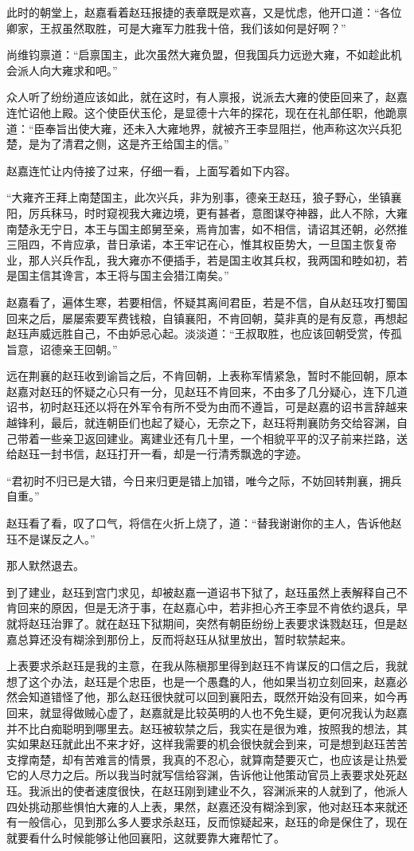 此时的朝堂上，赵嘉看着赵珏报捷的表章既是欢喜，又是忧虑，他开口道：“各位卿家，王叔虽然取胜，可是大雍军力胜我十倍，我们该如何是好啊？”

尚维钧禀道：“启禀国主，此次虽然大雍负盟，但我国兵力远逊大雍，不如趁此机会派人向大雍求和吧。”

众人听了纷纷道应该如此，就在这时，有人禀报，说派去大雍的使臣回来了，赵嘉连忙诏他上殿。这个使臣伏玉伦，是显德十六年的探花，现在在礼部任职，他跪禀道：“臣奉旨出使大雍，还未入大雍地界，就被齐王李显阻拦，他声称这次兴兵犯楚，是为了清君之侧，这是齐王给国主的信。”

赵嘉连忙让内侍接了过来，仔细一看，上面写着如下内容。

“大雍齐王拜上南楚国主，此次兴兵，非为别事，德亲王赵珏，狼子野心，坐镇襄阳，厉兵秣马，时时窥视我大雍边境，更有甚者，意图谋夺神器，此人不除，大雍南楚永无宁日，本王与国主郎舅至亲，焉肯加害，如不相信，请诏其还朝，必然推三阻四，不肯应承，昔日承诺，本王牢记在心，惟其权臣势大，一旦国主恢复帝业，那人兴兵作乱，我大雍亦不便插手，若是国主收其兵权，我两国和睦如初，若是国主信其谗言，本王将与国主会猎江南矣。”

赵嘉看了，遍体生寒，若要相信，怀疑其离间君臣，若是不信，自从赵珏攻打蜀国回来之后，屡屡索要军费钱粮，自镇襄阳，不肯回朝，莫非真的是有反意，再想起赵珏声威远胜自己，不由妒忌心起。淡淡道：“王叔取胜，也应该回朝受赏，传孤旨意，诏德亲王回朝。”

远在荆襄的赵珏收到谕旨之后，不肯回朝，上表称军情紧急，暂时不能回朝，原本赵嘉对赵珏的怀疑之心只有一分，见赵珏不肯回来，不由多了几分疑心，连下几道诏书，初时赵珏还以将在外军令有所不受为由而不遵旨，可是赵嘉的诏书言辞越来越锋利，最后，就连朝臣们也起了疑心，无奈之下，赵珏将荆襄防务交给容渊，自己带着一些亲卫返回建业。离建业还有几十里，一个相貌平平的汉子前来拦路，送给赵珏一封书信，赵珏打开一看，却是一行清秀飘逸的字迹。

“君初时不归已是大错，今日来归更是错上加错，唯今之际，不妨回转荆襄，拥兵自重。”

赵珏看了看，叹了口气，将信在火折上烧了，道：“替我谢谢你的主人，告诉他赵珏不是谋反之人。”

那人默然退去。

到了建业，赵珏到宫门求见，却被赵嘉一道诏书下狱了，赵珏虽然上表解释自己不肯回来的原因，但是无济于事，在赵嘉心中，若非担心齐王李显不肯依约退兵，早就将赵珏治罪了。就在赵珏下狱期间，突然有朝臣纷纷上表要求诛戮赵珏，但是赵嘉总算还没有糊涂到那份上，反而将赵珏从狱里放出，暂时软禁起来。

上表要求杀赵珏是我的主意，在我从陈稹那里得到赵珏不肯谋反的口信之后，我就想了这个办法，赵珏是个忠臣，也是一个愚蠢的人，他如果当初立刻回来，赵嘉必然会知道错怪了他，那么赵珏很快就可以回到襄阳去，既然开始没有回来，如今再回来，就显得做贼心虚了，赵嘉就是比较英明的人也不免生疑，更何况我认为赵嘉并不比白痴聪明到哪里去。赵珏被软禁之后，我实在是很为难，按照我的想法，其实如果赵珏就此出不来才好，这样我需要的机会很快就会到来，可是想到赵珏苦苦支撑南楚，却有苦难言的情景，我真的不忍心，就算南楚要灭亡，也应该是让热爱它的人尽力之后。所以我当时就写信给容渊，告诉他让他策动官员上表要求处死赵珏。我派出的使者速度很快，在赵珏刚到建业不久，容渊派来的人就到了，他派人四处挑动那些惧怕大雍的人上表，果然，赵嘉还没有糊涂到家，他对赵珏本来就还有一般信心，见到那么多人要求杀赵珏，反而惊疑起来，赵珏的命是保住了，现在就要看什么时候能够让他回襄阳，这就要靠大雍帮忙了。

